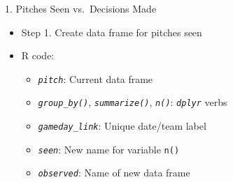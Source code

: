 \documentclass[14pt,ignorenonframetext,aspectratio = 1610]{beamer}
\newenvironment{Shaded}{\begin{snugshade}}{\end{snugshade}}
\newcommand{\KeywordTok}[1]{\textcolor[rgb]{0.13,0.29,0.53}{\textbf{{#1}}}}
\newcommand{\DataTypeTok}[1]{\textcolor[rgb]{0.13,0.29,0.53}{{#1}}}
\newcommand{\StringTok}[1]{\textcolor[rgb]{0.31,0.60,0.02}{{#1}}}
\newcommand{\NormalTok}[1]{{#1}}
\providecommand{\tightlist}{%
\setlength{\itemsep}{0pt}\setlength{\parskip}{0pt}}
\begin{document}
\begin{frame}[fragile]{1. Pitches Seen vs.~Decisions Made}

\begin{itemize}
\tightlist
\item
  Step 1. Create data frame for pitches seen
\item
  R code:

  \begin{itemize}
  \tightlist
  \item
    \emph{\texttt{pitch}}: Current data frame
  \item
    \emph{\texttt{group\_by()}}, \emph{\texttt{summarize()}},
    \emph{\texttt{n()}}: \emph{\texttt{dplyr}} verbs
  \item
    \emph{\texttt{gameday\_link}}: Unique date/team label
  \item
    \emph{\texttt{seen}}: New name for variable \texttt{n()}
  \item
    \emph{\texttt{observed}}: Name of new data frame
  \end{itemize}
\end{itemize}

\footnotesize

\begin{Shaded}
\end{Shaded}

\end{frame}
\end{document}
